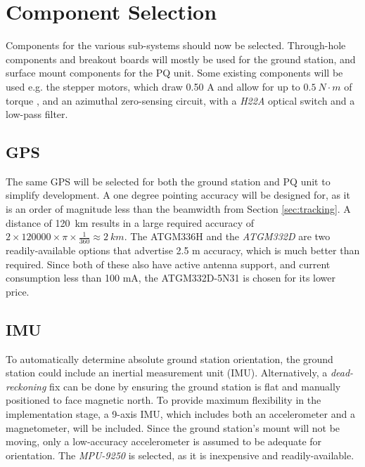 \graphicspath{{./figures}}

\section{Component Selection}
Components for the various sub-systems should now be selected. Through-hole components and breakout boards will mostly be used for the ground station, and surface mount components for the PQ unit. Some existing components will be used e.g. the stepper motors, which draw 0.50 A and allow for up to $\SI{0.5}{N \cdot m}$ of torque \cite{datasheet-4118}, and an azimuthal zero-sensing circuit, with a \textit{H22A} optical switch and a low-pass filter.

\subsection{GPS}\label{sec:components_gps}
The same GPS will be selected for both the ground station and PQ unit to simplify development. A one degree pointing accuracy will be designed for, as it is an order of magnitude less than the beamwidth from Section \ref{sec:tracking}. A distance of \SI{120}{km} results in a large required accuracy of $2 \times 120 000 \times \pi \times \frac{1}{360} \approx \SI{2}{km}$. The {ATGM336H} and the \textit{ATGM332D} are two readily-available options that advertise 2.5 m accuracy, which is much better than required. Since both of these also have active antenna support, and current consumption less than 100 mA, the ATGM332D-5N31 is chosen for its lower price.

\subsection{IMU}
To automatically determine absolute ground station orientation, the ground station could include an inertial measurement unit (IMU). Alternatively, a \textit{dead-reckoning} fix can be done by ensuring the ground station is flat and manually positioned to face magnetic north. To provide maximum flexibility in the implementation stage, a 9-axis IMU, which includes both an accelerometer and a magnetometer, will be included. Since the ground station's mount will not be moving, only a low-accuracy accelerometer is assumed to be adequate for orientation. The \textit{MPU-9250} is selected, as it is inexpensive and readily-available.

